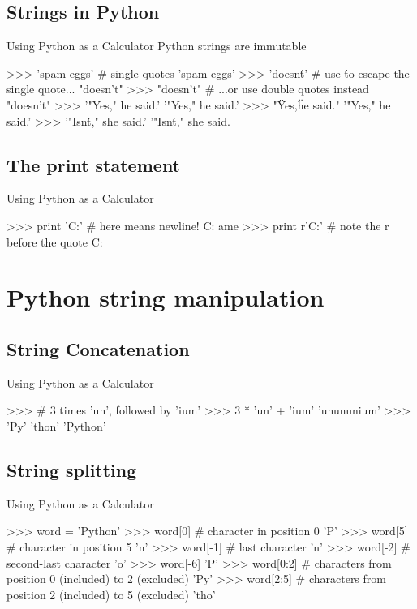 \documentclass[11pt]{beamer}
\begin{document}
\subsection{Strings in Python}
\begin{frame}[containsverbatim]{Using Python as a Calculator}
Python strings are immutable
\begin{python}
>>> 'spam eggs'  # single quotes
'spam eggs'
>>> 'doesn\'t'  # use \' to escape the single quote...
"doesn't"
>>> "doesn't"  # ...or use double quotes instead
"doesn't"
>>> '"Yes," he said.'
'"Yes," he said.'
>>> "\"Yes,\" he said."
'"Yes," he said.'
>>> '"Isn\'t," she said.'
'"Isn\'t," she said.
\end{python}
\end{frame}

\subsection{The print statement}
\begin{frame}[containsverbatim]{Using Python as a Calculator}
\begin{python}
>>> print 'C:\some\name'  # here \n means newline!
C:\some
ame
>>> print r'C:\some\name'  # note the r before the quote
C:\some\name
\end{python}
\end{frame}

\section{Python string manipulation}
\subsection{String Concatenation}
\begin{frame}[containsverbatim]{Using Python as a Calculator}
\begin{python}
>>> # 3 times 'un', followed by 'ium'
>>> 3 * 'un' + 'ium'
'unununium'
>>> 'Py' 'thon'
'Python'
\end{python}
\end{frame}

\subsection{String splitting}
\begin{frame}[containsverbatim]{Using Python as a Calculator}
\begin{python}
>>> word = 'Python'
>>> word[0]  # character in position 0
'P'
>>> word[5]  # character in position 5
'n'
>>> word[-1]  # last character
'n'
>>> word[-2]  # second-last character
'o'
>>> word[-6]
'P'
>>> word[0:2]  # characters from position 0 (included) to 2 (excluded)
'Py'
>>> word[2:5]  # characters from position 2 (included) to 5 (excluded)
'tho'
\end{python}
\end{frame}
\end{document}
